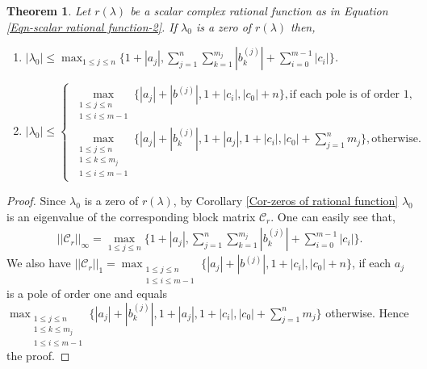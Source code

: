 \documentclass[12pt, reqno]{amsart}
\newtheorem{theorem}{Theorem}[section]
\theoremstyle{definition}
\theoremstyle{remark}
\numberwithin{equation}{section}
\begin{document}
\begin{theorem}\label{Thm-bounds for zeros using norms}
Let $r(\lambda)$ be a scalar complex rational function as in Equation 
\eqref{Eqn-scalar rational function-2}. If $\lambda_0$ is a zero of $r(\lambda)$ then,
\begin{enumerate}
\item $\displaystyle  |\lambda_0| \leq \max_{1 \leq j \leq n} \bigg\{1+|a_j|, 
\sum_{j=1}^{n} \sum_{k=1}^{m_j}|b_k^{(j)}|+ \sum_{i=0}^{m-1}|c_i| \bigg\}$.

\item {\small
 \[
|\lambda_0| \leq 
\begin{cases}
\max_{\substack{1 \leq j \leq n \\ 1 \leq i \leq m-1}} \bigg\{|a_j| + |b^{(j)}|, 
1 + |c_i|, |c_0| + n \bigg\}, \text{if each pole is of order $1$}, \\
\max_{\substack{1 \leq j \leq n \\ 1 \leq k \leq m_j \\ 1 \leq i \leq m-1}} 
\bigg\{|a_j| + |b_k^{(j)}|, 1 + |a_j|, 1 + |c_i|, |c_0| + \sum_{j=1}^{n}m_j \bigg\},  
\text{otherwise}.
\end{cases}
\]}


\end{enumerate}
\end{theorem}

\begin{proof}
Since $\lambda_0$ is a zero of $r(\lambda)$, by Corollary \ref{Cor-zeros of rational function} 
$\lambda_0$ is an eigenvalue of the corresponding block matrix $\mathcal{C}_r$. One 
can easily see that, 
\begin{align*}
||\mathcal{C}_r||_\infty \displaystyle= \max_{1 \leq j \leq n} \bigg\{1+|a_j|, 
\sum_{j=1}^{n} \sum_{k=1}^{m_j}|b_k^{(j)}|+ \sum_{i=0}^{m-1}|c_i| \bigg\}.
\end{align*}
We also have 
$||\mathcal{C}_r||_1 \displaystyle = \max_{\substack{1 \leq j \leq n \\ 1 \leq i \leq m-1}} 
\bigg\{|a_j|+|b^{(j)}|, 1+|c_i|, |c_0|+ n 
\bigg\}$, if each $a_j$ is a pole of order one and equals 
$\displaystyle \max_{\substack{1 \leq j \leq n \\ 1 \leq k \leq m_j\\ 1 \leq i 
\leq m-1}} \bigg\{|a_j|+|b_k^{(j)}|, 1+|a_j|, 1+|c_i|, |c_0|+ \sum_{j=1}^{n}m_j \bigg\}$ 
otherwise. Hence the proof.
\end{proof}
\end{document}
